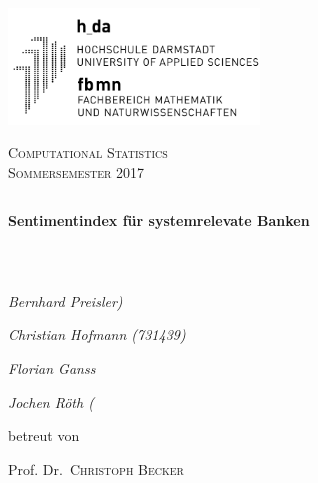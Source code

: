 \topmargin-15mm
\textwidth147mm

\topmargin-15mm
\textwidth147mm

\setlength{\parindent}{0pt}

\renewcommand{\footrulewidth}{0.8pt}

\begin{titlepage}
	\text{}\vspace{-0.15cm}\\
	\begin{center}\hspace{-1.15cm} 
		\includegraphics[width=0.5\textwidth]{logon.png} 
	\end{center}
	
	\vspace{1.0cm}
	
	\vspace{0.25cm}
	
	\begin{center}\Large{\textsc{Computational Statistics\\Sommersemester 2017}}
	\end{center}\vspace{3.7cm}
	
	\begin{tabularx}
		{\textwidth}{l}
		\hline
	\end{tabularx}
	
	\begin{center}
		\LARGE{\textbf{Sentimentindex für systemrelevate Banken}}
	\end{center}
	
	\begin{tabularx}
		{\textwidth}{l}
		\hline
	\end{tabularx}\vspace{1.4cm}\\
	
	
	\begin{center}
		{\Large\itshape Bernhard Preisler)\par}
		{\Large\itshape Christian Hofmann (731439)\par}
		{\Large\itshape Florian Ganss\par}
		{\Large\itshape Jochen Röth (\par}
	\end{center}
	\vfill
	betreut von\par
	Prof. Dr.~\textsc{Christoph Becker}
	

\end{titlepage}
